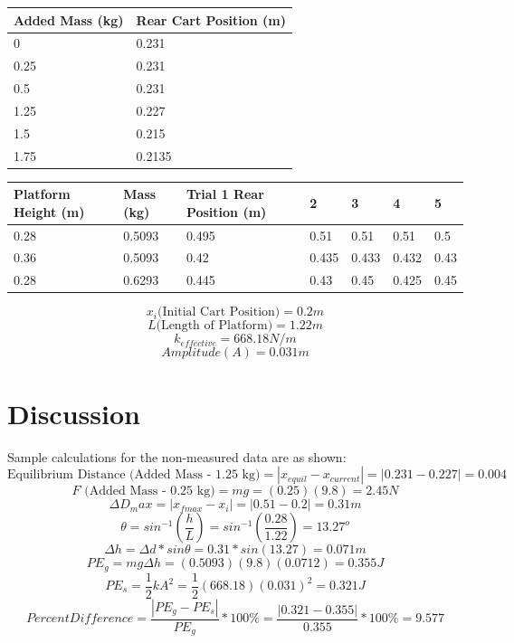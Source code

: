 \documentclass[11pt, titlepage]{article}
\begin{document}
\begin{center}
\begin{tabular}
{|m{15em}|m{15em}|}
\hline
Added Mass (kg) & Rear Cart Position (m) \\
\hline
0 & 0.231 \\
\hline
0.25 & 0.231 \\
\hline
0.5 & 0.231 \\
\hline
1.25 & 0.227 \\
\hline
1.5 & 0.215 \\
\hline
1.75 & 0.2135 \\
\hline
\end{tabular}

\begin{tabular}
{|m{5em}|m{5em}|m{5em}|m{5em}|m{5em}|m{5em}|m{5em}|}
\hline
Platform Height (m) & Mass (kg) & Trial 1 Rear Position (m) & 2 & 3 & 4 & 5 \\
\hline
0.28 & 0.5093 & 0.495 & 0.51 & 0.51 & 0.51 & 0.5 \\
\hline
0.36 & 0.5093 & 0.42 & 0.435 & 0.433 & 0.432 & 0.43 \\
\hline
0.28 & 0.6293 & 0.445 & 0.43 & 0.45 & 0.425 & 0.45 \\
\hline
\end{tabular}

$$x_i \text{(Initial Cart Position)} = 0.2 m$$
$$L \text{(Length of Platform)} = 1.22 m$$
$$k_{effective} = 668.18 N/m$$
$$Amplitude (A) = 0.031 m$$
\end{center}

\section*{Discussion}
Sample calculations for the non-measured data are as shown:
$$\text{Equilibrium Distance (Added Mass - 1.25 kg)} = |x_{equil} - x_{current}| = |0.231 - 0.227| = 0.004$$ 
$$F \text{ (Added Mass - 0.25 kg)} = mg = (0.25)(9.8) = 2.45 N$$
$$\Delta D_max = |x_{fmax} - x_i| = |0.51 - 0.2| = 0.31 m$$
$$\theta = sin^{-1}(\frac{h}{L}) = sin^{-1}(\frac{0.28}{1.22}) = 13.27^o$$
$$\Delta h = \Delta d * sin\theta = 0.31 * sin(13.27) = 0.071 m$$
$$PE_g = mg\Delta h = (0.5093)(9.8)(0.0712) = 0.355 J$$
$$PE_s = \frac{1}{2}kA^2 = \frac{1}{2}(668.18)(0.031)^2 = 0.321 J$$
$$Percent Difference = \frac{|PE_g - PE_s|}{PE_g} * 100\% = \frac{|0.321 - 0.355|}{0.355} * 100\% = 9.577$$
\end{document}
